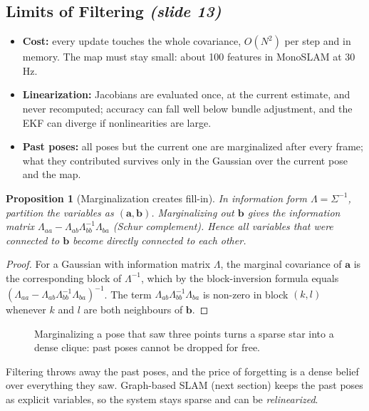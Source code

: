 \documentclass[11pt,a4paper]{article}
\newcommand{\slrs}[1]{\texorpdfstring{\emph{(slide #1)}}{(slide #1)}}
\newcommand{\bx}{\bm{x}}
\newcommand{\by}{\mathbf{y}}
\newcommand{\n}{{\bm{n}}}
\theoremstyle{definition}
\theoremstyle{plain}
\newtheorem{proposition}[definition]{Proposition}
\theoremstyle{remark}
\begin{document}
\subsection{Limits of Filtering \slrs{13}}
\begin{itemize}[nosep]
\item \textbf{Cost:} every update touches the whole covariance, $O(N^2)$ per step and in memory. The map must stay small: about 100 features in MonoSLAM at 30\,Hz.
\item \textbf{Linearization:} Jacobians are evaluated once, at the current estimate, and never recomputed; accuracy can fall well below bundle adjustment, and the EKF can diverge if nonlinearities are large.
\item \textbf{Past poses:} all poses but the current one are marginalized after every frame; what they contributed survives only in the Gaussian over the current pose and the map.
\end{itemize}

\begin{proposition}[Marginalization creates fill-in]\label{prop:fillin}
In information form $\Lambda=\Sigma^{-1}$, partition the variables as $(\mathbf a,\mathbf b)$. Marginalizing out $\mathbf b$ gives the information matrix $\Lambda_{aa}-\Lambda_{ab}\Lambda_{bb}^{-1}\Lambda_{ba}$ (Schur complement). Hence all variables that were connected to $\mathbf b$ become directly connected to each other.
\end{proposition}
\begin{proof}
For a Gaussian with information matrix $\Lambda$, the marginal covariance of $\mathbf a$ is the corresponding block of $\Lambda^{-1}$, which by the block-inversion formula equals $(\Lambda_{aa}-\Lambda_{ab}\Lambda_{bb}^{-1}\Lambda_{ba})^{-1}$. The term $\Lambda_{ab}\Lambda_{bb}^{-1}\Lambda_{ba}$ is non-zero in block $(k,l)$ whenever $k$ and $l$ are both neighbours of $\mathbf b$. \qedhere
\end{proof}
\begin{figure}[htbp]\centering
{}
\caption{Marginalizing a pose that saw three points turns a sparse star into a dense clique: past poses cannot be dropped for free.}
\end{figure}
\begin{intuition}
Filtering throws away the past poses, and the price of forgetting is a dense belief over everything they saw. Graph-based SLAM (next section) keeps the past poses as explicit variables, so the system stays sparse and can be \emph{relinearized}.
\end{intuition}
\end{document}
